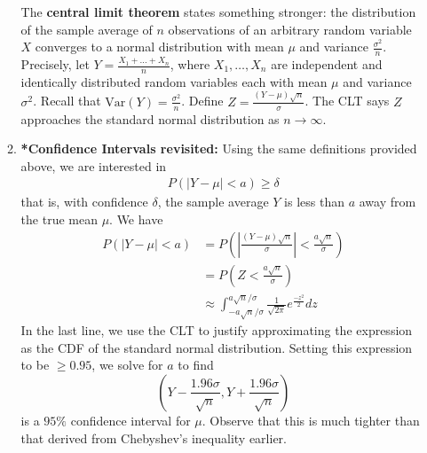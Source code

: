 \documentclass[10pt]{article}
\begin{document}
\begin{multicols}{2}
\begin{enumerate}
\begin{enumerate}
            The \textbf{central limit theorem} states something stronger: the distribution of the sample average of $n$ observations of an arbitrary random variable $X$ converges to a normal distribution with mean $\mu$ and variance $\frac{\sigma^2}{n}$. \\
            
            Precisely, let $Y=\frac{X_1+\ldots+X_n}{n}$, where $X_1, \ldots, X_n$ are independent and identically distributed random variables each with mean $\mu$ and variance $\sigma^2$. Recall that $\text{Var}(Y)=\frac{\sigma^2}{n}$. Define $Z=\frac{(Y-\mu)\sqrt{n}}{\sigma}$. The CLT says $Z$ approaches the standard normal distribution as $n\rightarrow\infty$.
            
            \item \textbf{*Confidence Intervals revisited:} Using the same definitions provided above, we are interested in
            \begin{align*}
                P(|Y-\mu| < a) \geq \delta
            \end{align*}
            that is, with confidence $\delta$, the sample average $Y$ is less than $a$ away from the true mean $\mu$. We have 
            \begin{align*}
                P(|Y-\mu| < a) &= P\left(\left| \frac{(Y-\mu)\sqrt{n}}{\sigma}\right| < \frac{a\sqrt{n}}{\sigma}\right) \\
                &= P\left( Z < \frac{a\sqrt{n}}{\sigma} \right) \\
                &\approx \int_{-a\sqrt{n} / \sigma}^{a\sqrt{n} / \sigma} \frac{1}{\sqrt{2\pi}} e^{\frac{-z^2}{2}} dz
            \end{align*}
            In the last line, we use the CLT to justify approximating the expression as the CDF of the standard normal distribution. Setting this expression to be $\geq 0.95$, we solve for $a$ to find $$\left(Y - \frac{1.96\sigma}{\sqrt{n}}, Y + \frac{1.96\sigma}{\sqrt{n}} \right)$$ is a $95\%$ confidence interval for $\mu$. Observe that this is much tighter than that derived from Chebyshev's inequality earlier.
        \end{enumerate}
    \end{enumerate}

\end{multicols}
\end{document}
